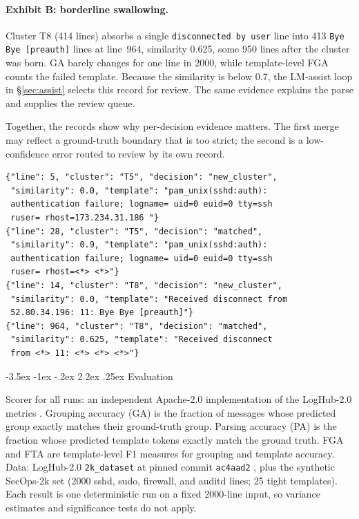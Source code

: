 \documentclass[11pt]{article}
\makeatletter
\renewcommand\section{\@startsection{section}{1}{\z@}%
  {-3.5ex \@plus -1ex \@minus -.2ex}%
  {2.2ex \@plus .25ex}%
  {\normalfont\Large\bfseries}}
\makeatother
\begin{document}
\paragraph{Exhibit B: borderline swallowing.} Cluster T8 (414 lines)
absorbs a single \texttt{disconnected by user} line into 413
\texttt{Bye Bye [preauth]} lines at line~964, similarity 0.625, some
950 lines after the cluster was born. GA barely changes for one line
in 2000, while template-level FGA counts the failed template. Because
the similarity is below 0.7, the LM-assist loop in
\S\ref{sec:assist} selects this record for review. The same evidence
explains the parse and supplies the review queue.

Together, the records show why per-decision evidence matters. The
first merge may reflect a ground-truth boundary that is too strict;
the second is a low-confidence error routed to review by its own
record.

\begin{lstlisting}[basicstyle=\ttfamily\footnotesize,caption={The four audit records behind both merges (line numbers and similarities verbatim).},label={lst:records}]
{"line": 5, "cluster": "T5", "decision": "new_cluster",
 "similarity": 0.0, "template": "pam_unix(sshd:auth):
 authentication failure; logname= uid=0 euid=0 tty=ssh
 ruser= rhost=173.234.31.186 "}
{"line": 28, "cluster": "T5", "decision": "matched",
 "similarity": 0.9, "template": "pam_unix(sshd:auth):
 authentication failure; logname= uid=0 euid=0 tty=ssh
 ruser= rhost=<*> <*>"}
{"line": 14, "cluster": "T8", "decision": "new_cluster",
 "similarity": 0.0, "template": "Received disconnect from
 52.80.34.196: 11: Bye Bye [preauth]"}
{"line": 964, "cluster": "T8", "decision": "matched",
 "similarity": 0.625, "template": "Received disconnect
 from <*> 11: <*> <*> <*>"}
\end{lstlisting}

\section{Evaluation}
\label{sec:eval}

Scorer for all runs: an independent Apache-2.0 implementation of the
LogHub-2.0 metrics \cite{jiang2024}. Grouping accuracy (GA) is the
fraction of messages whose predicted group exactly matches their
ground-truth group. Parsing accuracy (PA) is the fraction whose
predicted template tokens exactly match the ground truth. FGA and FTA
are template-level F1 measures for grouping and template accuracy.
Data:
LogHub-2.0 \texttt{2k\_dataset} at pinned commit
\texttt{ac4aad2} \cite{loghub20}, plus the synthetic SecOps-2k set
(2000 sshd, sudo, firewall, and auditd lines; 25 tight templates).
Each result is one deterministic run on a fixed 2000-line input, so
variance estimates and significance tests do not apply.
\end{document}

